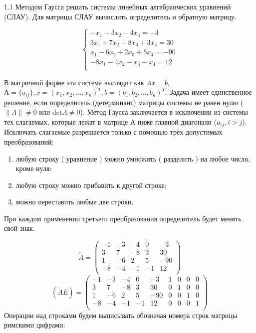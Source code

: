 \documentclass[10pt, a4paper]{scrartcl}
\date{}
\begin{document}
1.1 Методом Гаусса решить системы линейных алгебраических уравнений
(СЛАУ). Для матрицы СЛАУ вычислить определитель и обратную матрицу.

\[\begin{cases}
-x_1 - 3x_2 - 4x_3 = -3\\
3x_1 + 7x_2 - 8x_3 + 3x_4 = 30\\
x_1 - 6x_2 + 2x_3 + 5x_4 = -90\\
-8x_1 - 4x_2 - x_3 - x_4 = 12\\
\end{cases}\]

В матричной форме эта система выглядит как
\(A \overline{x}=\overline{b}\),
\(А=\{ a_{ij}\}, \overline{x}=(x_1,x_2,\dots ,x_n)^T, \overline{b}= (b_1, b_2, \dots , b_n)^T\).
Задача имеет единственное решение, если определитель (детерминант)
матрицы системы не равен нулю ( \(\|A\|\neq 0\) или
\(\mathrm{det} A \neq 0\)). Метод Гаусса заключается в исключении из
системы тех слагаемых, которые лежат в матрице А ниже главной диагонали
(\(a_{ij}, i>j\)). Исключать слагаемые разрешается только с помощью трёх
допустимых преобразований:

\begin{enumerate}
\def\labelenumi{\arabic{enumi})}
\item
  любую строку ( уравнение ) можно умножить ( разделить ) на любое
  число, кроме нуля:
\item
  любую строку можно прибавить к другой строке;
\item
  можно переставить любые две строки.
\end{enumerate}

При каждом применении третьего преобразования определитель будет менять
свой знак.

\[\widetilde{A} = \begin{pmatrix} 
-1 & -3 & -4 & 0 & -3\\
3 & 7 & -8 & 3 & 30\\
1 & -6 & 2 & 5 & -90\\
-8 & -4 & -1 & -1 & 12\\
\end{pmatrix}\] \[(\widetilde{A}E) = \begin{pmatrix} 
-1 & -3 & -4 & 0 & -3 & 1 & 0 & 0 & 0\\
3 & 7 & -8 & 3 & 30 & 0 & 1 & 0 & 0\\
1 & -6 & 2 & 5 & -90 & 0 & 0 & 1 & 0\\
-8 & -4 & -1 & -1 & 12 & 0 & 0 & 0 & 1\\
\end{pmatrix}\] Операции над строками будем выписывать обозначая номера
строк матрицы римскими цифрами:
\end{document}
